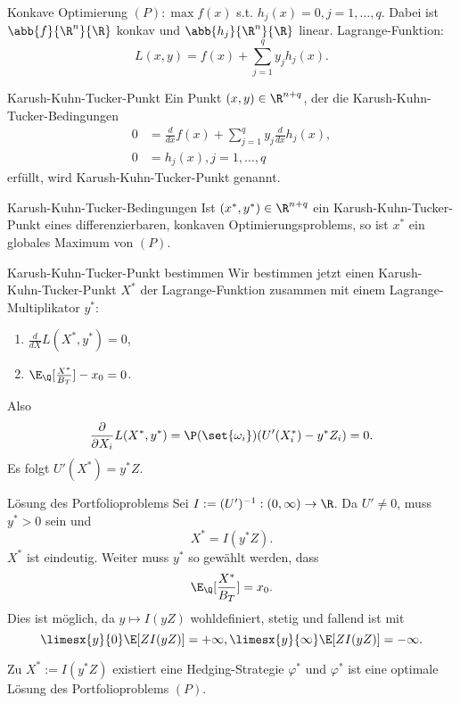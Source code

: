 \begin{karte}{Konkave Optimierung}
\((P): \max f(x)\) s.t. \(h_j(x) = 0, j=1,\ldots, q\). Dabei ist \(\abb{f}{\R^n}{\R}\) 
konkav und \(\abb{h_j}{\R^n}{\R}\) linear. Lagrange-Funktion: 
\[ L(x,y) = f(x) + \sum_{j=1}^q y_j h_j(x). \]
\end{karte}

\begin{karte}{Karush-Kuhn-Tucker-Punkt}
Ein Punkt \((x,y) \in \R^{n+q}\), der die Karush-Kuhn-Tucker-Bedingungen 
\begin{align*}
    0 &= \frac{d}{dx} f(x) + \sum_{j=1}^q y_j \frac{d}{dx} h_j(x), \\
    0 &= h_j(x), j = 1,\ldots, q
\end{align*}
erfüllt, wird Karush-Kuhn-Tucker-Punkt genannt.
\end{karte}

\begin{karte}{Karush-Kuhn-Tucker-Bedingungen}
Ist \((x^*, y^*) \in \R^{n+q}\) ein Karush-Kuhn-Tucker-Punkt eines 
differenzierbaren, konkaven Optimierungsproblems, so ist \(x^*\) ein 
globales Maximum von \((P)\).
\end{karte}

\begin{karte}{Karush-Kuhn-Tucker-Punkt bestimmen}
Wir bestimmen jetzt einen Karush-Kuhn-Tucker-Punkt \(X^*\) der 
Lagrange-Funktion zusammen mit einem Lagrange-Multiplikator \(y^*\): 
\begin{enumerate}
    \item \(\frac{d}{dX} L(X^*, y^*) = 0\), 
    \item \(\E_\Q[\frac{X^*}{B_T}] - x_0 = 0\).
\end{enumerate}
Also 
\[ \frac{\partial}{\partial X_i} L(X^*, y^*) = \P(\set{\omega_i}) (U'(X_i^*) - y^* Z_i) = 0. \]
Es folgt \(U'(X^*) = y^* Z\).
\end{karte}

\begin{karte}{Lösung des Portfolioproblems}
Sei \( I := (U')^{-1}: (0,\infty)\rightarrow\R\). Da \(U'\neq 0\), 
muss \(y^* > 0\) sein und 
\[ X^* = I(y^*Z). \]
\(X^*\) ist eindeutig. Weiter muss \(y^*\) so gewählt werden, dass 
\[ \E_\Q[\frac{X^*}{B_T}] = x_0. \]
Dies ist möglich, da \(y \mapsto I(yZ)\) wohldefiniert, stetig und fallend ist mit 
\[ \limesx{y}{0} \E[Z I(yZ)] = +\infty, \limesx{y}{\infty} \E[Z I(yZ)] = -\infty. \]

Zu \(X^* := I(y^* Z)\) existiert eine Hedging-Strategie \(\varphi^*\) 
und \(\varphi^*\) ist eine optimale Lösung des Portfolioproblems \((P)\).
\end{karte}


